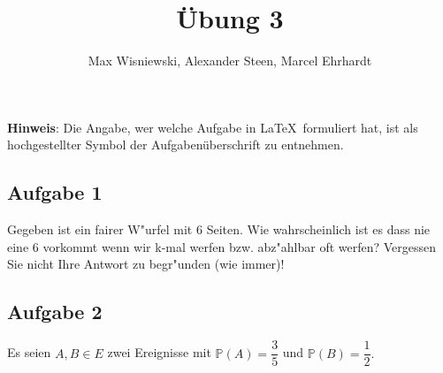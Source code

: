 \documentclass[11pt,a4paper,ngerman]{article}
\date{}
\title{Übung 3}
\author{Max Wisniewski\maxw, Alexander Steen\alex, Marcel Ehrhardt\marcel}
\newcommand{\Prob}{\mathbb{P}}
\begin{document}

\renewcommand{\figurename}{Figure}

\maketitle
\thispagestyle{fancy}

\begin{center}
\textbf{Hinweis}: Die Angabe, wer welche Aufgabe in \LaTeX\ formuliert hat, ist als hochgestellter Symbol der Aufgabenüberschrift zu entnehmen.
\end{center}


\subsection*{Aufgabe 1}
Gegeben ist ein fairer W"urfel mit 6 Seiten. Wie wahrscheinlich ist es dass nie eine
6 vorkommt wenn wir k-mal werfen bzw. abz"ahlbar oft werfen? Vergessen Sie nicht
Ihre Antwort zu begr"unden (wie immer)!

\subsection*{Aufgabe 2}
Es seien $A, B \in E$ zwei Ereignisse mit $\Prob(A) = \dfrac{3}{5}$ und
$\Prob(B) = \dfrac{1}{2}.$
\end{document}
